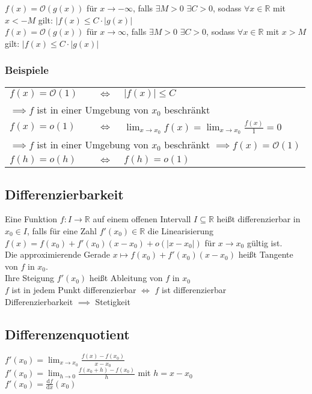 \documentclass[a4paper,9pt]{extarticle}
\begin{document}
	$f(x) = \mathcal{O}(g(x))$ für $x → -∞$, falls $\exists M > 0$ $\exists C > 0$, sodass $\forall x \in \mathbb{R}$ mit $x < -M$ gilt: $|f(x) ≤ C ⋅ |g(x)|$ \\
	
	$f(x) = \mathcal{O}(g(x))$ für $x → ∞$, falls $\exists M > 0$ $\exists C > 0$, sodass $\forall x \in \mathbb{R}$ mit $x > M$ gilt: $|f(x) ≤ C ⋅ |g(x)|$ \\
	
	\subsubsection*{Beispiele}
	\begin{tabular}{lcl}
		$f(x) = \mathcal{O}(1)$ & $\iff$ & $|f(x)| ≤ C$ \\
		\multicolumn{3}{l}{$\implies f$ ist in einer Umgebung von $x_0$ beschränkt} \\
		$f(x) = o(1)$ & $\iff$ & $\lim_{x → x_0} f(x) = \lim_{x → x_0} \frac{f(x)}{1} = 0$ \\
		\multicolumn{3}{l}{$\implies f$ ist in einer Umgebung von $x_0$ beschränkt $\implies f(x) = \mathcal{O}(1)$} \\
		$f(h) = o(h)$ & $\iff$ & $f(h) = o(1)$ \\		
	\end{tabular}

	\subsection*{Differenzierbarkeit}
	Eine Funktion $f : I → \mathbb{R}$ auf einem offenen Intervall $I ⊆ \mathbb{R}$ heißt differenzierbar in $x_0 \in I$, falls für eine Zahl $f'(x_0) \in \mathbb{R}$ die Linearisierung $f(x) = f(x_0) + f'(x_0)(x-x_0) + o(|x-x_0|)$ für $x → x_0$ gültig ist. \\
	
	Die approximierende Gerade $x \mapsto f(x_0)+f'(x_0)(x-x_0)$ heißt Tangente von $f$ in $x_0$. \\
	
	Ihre Steigung $f'(x_0)$ heißt Ableitung von $f$ in $x_0$ \\
	
	$f$ ist in jedem Punkt differenzierbar $\iff$ $f$ ist differenzierbar \\
	
	Differenzierbarkeit $\implies$ Stetigkeit
	
	\subsection*{Differenzenquotient}
	$f'(x_0) = \lim_{x → x_0} \frac{f(x) - f(x_0)}{x - x_0}$ \\
	$f'(x_0) = \lim_{h → 0} \frac{f(x_0+h) - f(x_0)}{h}$ mit $h = x - x_0$ \\
	$f'(x_0) = \frac{\text{d}f}{\text{d}x}(x_0)$
	
\end{document}
